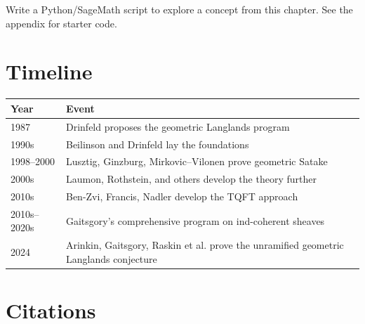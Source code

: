 \begin{exercise}[Computational]
Write a Python/SageMath script to explore a concept from this chapter. See the appendix for starter code.
\end{exercise}

\section{Timeline}

\begin{tabularx}{\linewidth}{lX}
\toprule
\textbf{Year} & \textbf{Event} \\ \midrule
1987 & Drinfeld proposes the geometric Langlands program \cite{drinfeld1987} \\ 
1990s & Beilinson and Drinfeld lay the foundations \cite{beilinson2004} \\ 
1998--2000 & Lusztig, Ginzburg, Mirkovic--Vilonen prove geometric Satake \cite{mirkovic2007} \\
2000s & Laumon, Rothstein, and others develop the theory further \\ 
2010s & Ben-Zvi, Francis, Nadler develop the TQFT approach \cite{benzvi2014} \\ 
2010s--2020s & Gaitsgory's comprehensive program on ind-coherent sheaves \cite{gaitsgory2009} \\ 
2024 & Arinkin, Gaitsgory, Raskin et al. prove the unramified geometric Langlands conjecture \cite{arinkin2024} \\ \bottomrule
\end{tabularx}

\section{Citations}

